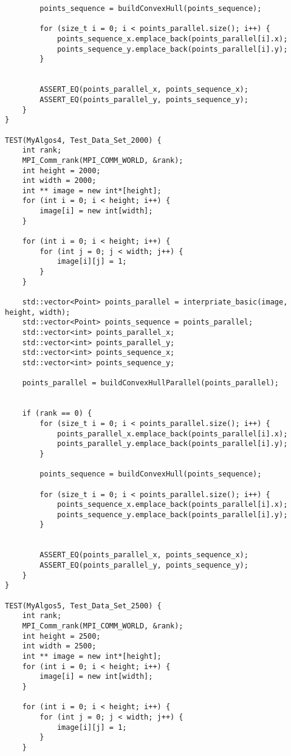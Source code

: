 \documentclass{report}
\begin{document}
\begin{lstlisting}
        points_sequence = buildConvexHull(points_sequence);

        for (size_t i = 0; i < points_parallel.size(); i++) {
            points_sequence_x.emplace_back(points_parallel[i].x);
            points_sequence_y.emplace_back(points_parallel[i].y);
        }


        ASSERT_EQ(points_parallel_x, points_sequence_x);
        ASSERT_EQ(points_parallel_y, points_sequence_y);
    }
}

TEST(MyAlgos4, Test_Data_Set_2000) {
    int rank;
    MPI_Comm_rank(MPI_COMM_WORLD, &rank);
    int height = 2000;
    int width = 2000;
    int ** image = new int*[height];
    for (int i = 0; i < height; i++) {
        image[i] = new int[width];
    }

    for (int i = 0; i < height; i++) {
        for (int j = 0; j < width; j++) {
            image[i][j] = 1;
        }
    }

    std::vector<Point> points_parallel = interpriate_basic(image, height, width);
    std::vector<Point> points_sequence = points_parallel;
    std::vector<int> points_parallel_x;
    std::vector<int> points_parallel_y;
    std::vector<int> points_sequence_x;
    std::vector<int> points_sequence_y;

    points_parallel = buildConvexHullParallel(points_parallel);


    if (rank == 0) {
        for (size_t i = 0; i < points_parallel.size(); i++) {
            points_parallel_x.emplace_back(points_parallel[i].x);
            points_parallel_y.emplace_back(points_parallel[i].y);
        }

        points_sequence = buildConvexHull(points_sequence);

        for (size_t i = 0; i < points_parallel.size(); i++) {
            points_sequence_x.emplace_back(points_parallel[i].x);
            points_sequence_y.emplace_back(points_parallel[i].y);
        }


        ASSERT_EQ(points_parallel_x, points_sequence_x);
        ASSERT_EQ(points_parallel_y, points_sequence_y);
    }
}

TEST(MyAlgos5, Test_Data_Set_2500) {
    int rank;
    MPI_Comm_rank(MPI_COMM_WORLD, &rank);
    int height = 2500;
    int width = 2500;
    int ** image = new int*[height];
    for (int i = 0; i < height; i++) {
        image[i] = new int[width];
    }

    for (int i = 0; i < height; i++) {
        for (int j = 0; j < width; j++) {
            image[i][j] = 1;
        }
    }


\end{lstlisting}
\end{document}
